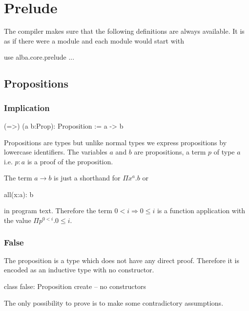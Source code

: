 \section{Prelude}

The compiler makes sure that the following definitions are always
available. It is as if there were a module  and each
module would start with
\begin{alba}
  use
     alba.core.prelude
     ...
\end{alba}



\subsection{Propositions}
\label{sec:prelude-propositions}


\subsubsection{Implication}
%
\begin{alba}
  (=>) (a b:Prop): Proposition
    := a -> b
\end{alba}

Propositions are types but unlike normal types we express propositions by
lowercase identifiers. The variables $a$ and $b$ are propositions, a term $p$
of type $a$ i.e. $p:a$ is a proof of the proposition.

The term $a\to b$ is just a shorthand for $\Pi x^a.b$ or
\begin{alba}
  all(x:a): b
\end{alba}
in program text. Therefore the term $0 < i \Rightarrow 0 \le i$ is a function
application with the value $\Pi p^{0 < i}. 0 \le i$.
\newline

\subsubsection{False}

The proposition  is a type which does not have any direct
proof. Therefore it is encoded as an inductive type with no constructor.
%
\begin{alba}
  class
    false: Proposition
  create
    -- no constructors
\end{alba}

The only possibility to prove  is to make some contradictory
assumptions. \vskip 2mm


